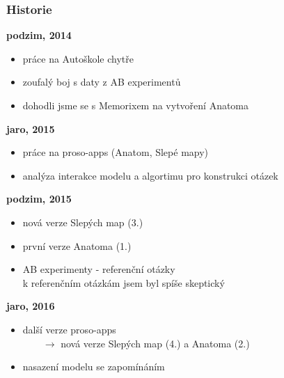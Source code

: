 \documentclass[xcolor=svgnames]{beamer}
\begin{document}
\begin{frame}
	\frametitle{Historie}
	\textbf{podzim, 2014}
		\begin{itemize}
			\item práce na Autoškole chytře
			\item zoufalý boj s daty z AB experimentů
			\item dohodli jsme se s Memorixem na vytvoření Anatoma
		\end{itemize}
	\pause
	\textbf{jaro, 2015}
		\begin{itemize}
			\item práce na proso-apps (Anatom, Slepé mapy)
			\item analýza interakce modelu a algortimu pro konstrukci otázek
		\end{itemize}
	\pause
	\textbf{podzim, 2015}
		\begin{itemize}
			\item nová verze Slepých map (3.)
			\item první verze Anatoma (1.)
			\item {} AB experimenty - referenční otázky\\
				{\tiny k referenčním otázkám jsem byl spíše skeptický}
		\end{itemize}
	\pause
	\textbf{jaro, 2016}
		\begin{itemize}
			\item další verze proso-apps\\~~~~$\rightarrow$ nová verze Slepých map (4.) a Anatoma (2.)
			\item nasazení modelu se zapomínáním
		\end{itemize}
\end{frame}
\begin{frame}[plain]
	\noindent{}
\end{frame}
\end{document}
